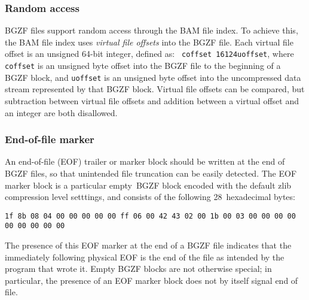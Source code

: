 \documentclass[10pt]{article}
\begin{document}
\subsubsection{Random access}

BGZF files support random access through the BAM file index. To achieve
this, the BAM file index uses \emph{virtual file offsets} into the BGZF
file. Each virtual file offset is an unsigned 64-bit integer, defined as: {\tt
  coffset 16\char124uoffset}, where {\tt coffset} is an
unsigned byte offset into the BGZF file to the beginning of a BGZF
block, and {\tt uoffset} is an unsigned byte offset into the
uncompressed data stream represented by that BGZF block. Virtual file
offsets can be compared, but subtraction between virtual file offsets
and addition between a virtual offset and an integer are both
disallowed.

\subsubsection{End-of-file marker}

An end-of-file (EOF) trailer or marker block should be written at the end
of BGZF files, so that unintended file truncation can be easily detected.
The EOF marker block is a particular empty\footnotemark\ BGZF block
encoded with the default {\sf zlib} compression level setttings,
and consists of the following 28~hexadecimal bytes:
\begin{center}
\texttt{1f 8b 08 04 00 00 00 00 00 ff 06 00 42 43 02 00 1b 00 03 00 00 00 00 00 00 00 00 00}
\end{center}


\noindent
The presence of this EOF marker at the end of a BGZF file indicates that the
immediately following physical EOF is the end of the file as intended by the
program that wrote it.
Empty BGZF blocks are not otherwise special; in particular, the presence of
an EOF marker block does not by itself signal end of file.\footnotemark

\end{document}
